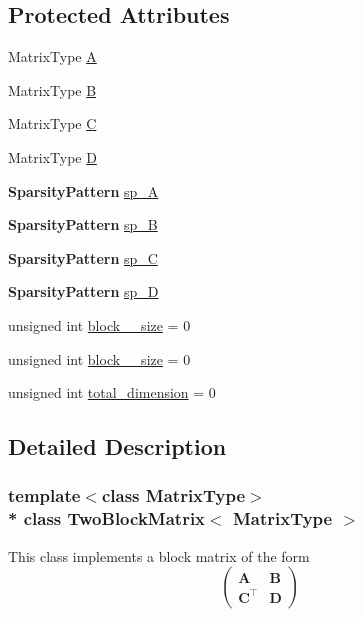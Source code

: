 \subsection*{Protected Attributes}
\begin{DoxyCompactItemize}
\item 
Matrix\+Type \hyperlink{class_two_block_matrix_a91b02f00cf56b398e1624227e6efc8c6}{A}
\item 
Matrix\+Type \hyperlink{class_two_block_matrix_ae8edfe1cd2298741586dcc46a4d09ebf}{B}
\item 
Matrix\+Type \hyperlink{class_two_block_matrix_a847505a77448124928540be0367d8747}{C}
\item 
Matrix\+Type \hyperlink{class_two_block_matrix_a72c598f36d3e8cce12821a09920ded2d}{D}
\item 
{\bf Sparsity\+Pattern} \hyperlink{class_two_block_matrix_af40216911c197c73687f7d3a1ff4e68e}{sp\+\_\+A}
\item 
{\bf Sparsity\+Pattern} \hyperlink{class_two_block_matrix_a854c7e77623a7c0012aa0ceeb60c147a}{sp\+\_\+B}
\item 
{\bf Sparsity\+Pattern} \hyperlink{class_two_block_matrix_a45d6e534ad775577c86e9ac9a116014e}{sp\+\_\+C}
\item 
{\bf Sparsity\+Pattern} \hyperlink{class_two_block_matrix_adb1833352096be79279134b218659665}{sp\+\_\+D}
\item 
unsigned int \hyperlink{class_two_block_matrix_ae862db333ed43f1650d4926f237cfc43}{block\+\_\+\_\+size} = 0
\item 
unsigned int \hyperlink{class_two_block_matrix_a60ddea1d26313aac35cfb2ae9f192cb2}{block\+\_\+\_\+size} = 0
\item 
unsigned int \hyperlink{class_two_block_matrix_a7d63b4c4c1e499c9f9913444dc5fd6b6}{total\+\_\+dimension} = 0
\end{DoxyCompactItemize}


\subsection{Detailed Description}
\subsubsection*{template$<$class Matrix\+Type$>$\\*
class Two\+Block\+Matrix$<$ Matrix\+Type $>$}

This class implements a block matrix of the form \begin{equation*} \begin{pmatrix} \boldsymbol{A} & \boldsymbol{B} \\ \boldsymbol{C}^\top & \boldsymbol{D} \end{pmatrix} \end{equation*}

